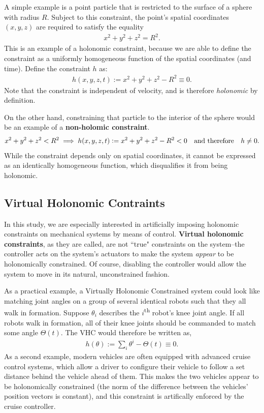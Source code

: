 \documentclass[main.tex]{subfiles}
\begin{document}
A simple example is a point particle that is restricted to the surface of a sphere with radius $R$. Subject to this constraint, the point's spatial coordinates $(x,y,z)$ are required to satisfy the equality
\begin{align}
    x^2+y^2+z^2=R^2.
\end{align}
This is an example of a holonomic constraint, because we are able to define the constraint as a uniformly homogeneous function of the spatial coordinates (and time). Define the constraint $h$ as:
\begin{align}
    h(x,y,z,t):=x^2+y^2+z^2-R^2\equiv 0.
\end{align}
Note that the constraint is independent of velocity, and is therefore \textit{holonomic} by definition.

On the other hand, constraining that particle to the {interior} of the sphere would be an example of a \textbf{non-holomic constraint}. 
\begin{align}
    x^2+y^2+z^2<R^2 \implies h(x,y,z,t):=x^2+y^2+z^2-R^2<0\qq{and therefore}h\neq 0.
\end{align}
While the constraint depends only on spatial coordinates, it cannot be expressed as an identically homogeneous function, which disqualifies it from being holonomic.

\subsection{Virtual Holonomic Contraints }\label{vhc-section}
In this study, we are especially interested in artificially imposing holonomic constraints on mechanical systems by means of control. \textbf{Virtual holonomic constraints}, as they are called, are not ``true" constraints on the system--the controller acts on the system's actuators to make the system \textit{appear} to be holonomically constrained. Of course, disabling the controller would allow the system to move in its natural, unconstrained fashion.

As a practical example, a Virtually Holonomic Constrained system could look like matching joint angles on a group of several identical robots such that they all walk in formation\cite{maggiore2012virtual}. Suppose $\theta_i$ describes the $i$\textsuperscript{th} robot's knee joint angle. If all robots walk in formation, all of their knee joints should be commanded to match some angle $\Theta(t)$. The VHC would therefore be written as,
\begin{align}
    h(\theta):=\sum_i \theta^i-\Theta(t)\equiv 0.
\end{align}
As a second example, modern vehicles are often equipped with advanced cruise control systems, which allow a driver to configure their vehicle to follow a set distance behind the vehicle ahead of them. This makes the two vehicles appear to be holonomically constrained (the norm of the difference between the vehicles' position vectors is constant), and this constraint is artifically enforced by the cruise controller.
\end{document}

